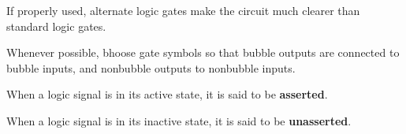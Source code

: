         \par If properly used, alternate logic gates make the circuit much clearer than standard
        logic gates.
        \par Whenever possible, bhoose gate symbols so that bubble outputs are connected to bubble
        inputs, and nonbubble outputs to nonbubble inputs.
        \par When a logic signal is in its active state, it is said to be \textbf{asserted}.
        \par When a logic signal is in its inactive state, it is said to be \textbf{unasserted}.

